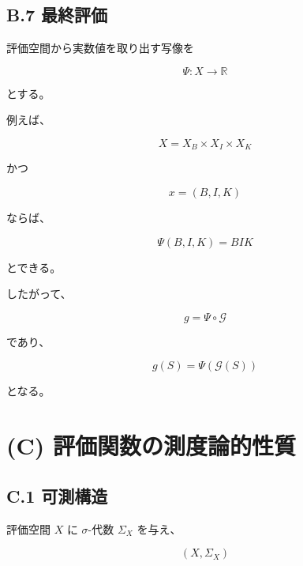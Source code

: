 \documentclass[a4paper,11pt]{article}
\newcommand{\R}{\mathbb{R}}
\newcommand{\Eval}{\mathcal{G}}
\newcommand{\EvalMap}{\Psi}
\begin{document}
\subsection{B.7 最終評価}

評価空間から実数値を取り出す写像を

\begin{equation}
    \EvalMap:X\to\R
\end{equation}

とする。

例えば、

\begin{equation}
    X=X_B\times X_I\times X_K
\end{equation}

かつ

\begin{equation}
    x=(B,I,K)
\end{equation}

ならば、

\begin{equation}
    \EvalMap(B,I,K)=BIK
\end{equation}

とできる。

したがって、

\begin{equation}
    g
    =
    \EvalMap\circ\Eval
\end{equation}

であり、

\begin{equation}
    g(S)
    =
    \EvalMap(\Eval(S))
\end{equation}

となる。


\section{(C) 評価関数の測度論的性質}

\subsection{C.1 可測構造}

評価空間 $X$ に $\sigma$-代数 $\Sigma_X$ を与え、

\begin{equation}
    (X,\Sigma_X)
\end{equation}
\end{document}
